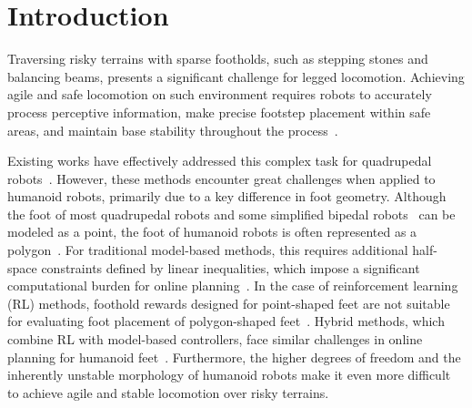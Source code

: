 \section{Introduction}

Traversing risky terrains with sparse footholds, such as stepping stones and balancing beams, presents a significant challenge for legged locomotion. Achieving agile and safe locomotion on such environment requires robots to accurately process perceptive information, make precise footstep placement within safe areas, and maintain base stability throughout the process~\cite{yu2024walking, Zhang2023LearningAL}.

Existing works have effectively addressed this complex task for quadrupedal robots~\cite{gangapurwala2022rloc, grandia2023perceptive, jenelten2024dtc, lu2024learning, xie2022glide, yu2024walking, yu2021visual, Zhang2023LearningAL, zhu2024robust}. However, these methods encounter great challenges when applied to humanoid robots, primarily due to a key difference in foot geometry. Although the foot of most quadrupedal robots and some simplified bipedal robots~\cite{englsberger2011bipedal, kajita20013d} can be modeled as a point, the foot of humanoid robots is often represented as a polygon~\cite{chestnutt2005footstep, griffin2019footstep, hornung2012adaptive, stumpf2014supervised}. For traditional model-based methods, this requires additional half-space constraints defined by linear inequalities, which impose a significant computational burden for online planning~\cite{deits2014footstep, griffin2019footstep, margolis2021learning, stumpf2014supervised}. In the case of reinforcement learning (RL) methods, foothold rewards designed for point-shaped feet are not suitable for evaluating foot placement of polygon-shaped feet~\cite{yu2024walking}. Hybrid methods, which combine RL with model-based controllers, face similar challenges in online planning for humanoid feet~\cite{gangapurwala2022rloc, jenelten2024dtc, xie2022glide}. Furthermore, the higher degrees of freedom and the inherently unstable morphology of humanoid robots make it even more difficult to achieve agile and stable locomotion over risky terrains.

